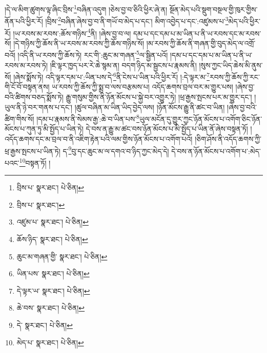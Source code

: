 །དེ་ལ་མིག་ཚུགས་ལྟ་ཞིང་བྲིས་\footnote{བྲིས་པ་  སྣར་ཐང་།  པེ་ཅིན། }བཞིན་འདུག །ཅེས་བྱ་བ་ཅིའི་ཕྱིར་ཞེ་ན། སྔོན་མེད་པའི་སྡུག་བསྔལ་གྱི་ཁུར་གྱིས་ནོན་པའི་ཕྱིར་རོ། །བྲིས་\footnote{བྲིས་པ་  སྣར་ཐང་། }བཞིན་ཞེས་བྱ་བ་ནི་གཡོ་བ་མེད་པ་དང་། མིག་འབྱེད་པ་དང་:འཛུམས་པ་\footnote{འཛུམ་པ་  སྣར་ཐང་།  པེ་ཅིན། }མེད་པའི་ཕྱིར་རོ། །ཡ་རབས་མ་རབས་:ཆོས་གཉིས་\footnote{ཆོས་ཉིད་  སྣར་ཐང་།  པེ་ཅིན། }ནི། །ཞེས་བྱ་བ་ལ། དམ་པ་དང་དམ་པ་མ་ཡིན་པ་ནི་ཡ་རབས་དང་མ་རབས་སོ། །དེ་གཉིས་ཀྱི་ཆོས་ནི་ཡ་རབས་མ་རབས་ཀྱི་ཆོས་གཉིས་སོ། །མ་རབས་ཀྱི་ཆོས་ནི་གཞན་གྱི་བུད་མེད་ལ་འགྲོ་བའོ། །འདི་ནི་ཡ་རབས་ཀྱི་ཆོས་ཏེ། རང་གི་:ཆུང་མ་གཞན་\footnote{ཆུང་མ་གཞན་གྱི་  སྣར་ཐང་།  པེ་ཅིན། }ལ་སྦྱིན་པའོ། །དམ་པ་དང་དམ་པ་མ་ཡིན་པ་ནི་ཡ་རབས་མ་རབས་ཏེ། །ཇི་ལྟར་ཁྱད་པར་རེ་ཆེ་སྙམ་ན། བདག་ཉིད་མ་སྦྱངས་པ་རྣམས་ནི། །སུས་ཀྱང་ཡིད་ཆེས་མི་ནུས་སོ། །ཞེས་སྨོས་ཏེ། འདི་ལྟར་དམ་པ་:ཡིན་པས་དེ་\footnote{ཡིན་པས་  སྣར་ཐང་།  པེ་ཅིན། }ནི་ངེས་པ་ཡིན་པའི་ཕྱིར་རོ། །:དེ་ལྟར་མ་\footnote{དེ་ལྟར་ཡ་  སྣར་ཐང་།  པེ་ཅིན། }རབས་ཀྱི་ཆོས་ཀྱི་རང་གི་ངོ་བོ་བསྟན་ནས། ཡ་རབས་ཀྱི་ཆོས་ཀྱི་སྨྲ་བ་ལས་བརྩམས་པ། འདོད་ཆགས་བྲལ་བར་མ་གྱུར་པས། །ཞེས་བྱ་བའི་ཚིགས་བཅད་སྨོས་ཏེ། རྒྱུ་གསུམ་གྱིས་ནི་ཉོན་མོངས་པ་སྐྱེ་བར་འགྱུར་ཏེ། །ཕྲ་རྒྱས་སྤངས་པར་མ་གྱུར་དང་། །ཡུལ་ནི་ཉེ་བར་གནས་པ་དང་། །ཚུལ་བཞིན་མ་ཡིན་ཡིད་བྱེད་ལས། །ཉོན་མོངས་རྒྱུ་ནི་ཚང་བ་ཡིན། །ཞེས་བྱ་བའི་ཚིག་གིས་སོ། །དམ་པ་རྣམས་ནི་སེམས་རྒྱ་:ཆེ་བ་ཡིན་པས་\footnote{ཆེ་བས་  སྣར་ཐང་།  པེ་ཅིན། }ཡུལ་མངོན་དུ་གྱུར་ཀྱང་ཉོན་མོངས་པ་འགོག་ཅིང་ཉོན་མོངས་པ་ཀུན་ཏུ་མི་སྤྱོད་པ་ཡིན་ཏེ། དེ་བས་ན་རྒྱུ་མ་ཚང་བས་ཉོན་མོངས་པ་མི་སྤྱོད་པ་ཡིན་ནོ་ཞེས་བསྟན་ཏོ། །འདོད་ཆགས་དང་མ་བྲལ་བ་ནི་འཇིག་རྟེན་པའི་ལམ་གྱིས་ཉོན་མོངས་པ་འགོག་པའོ། །ཅིག་ཤོས་ནི་འདོད་ཆགས་ཀྱི་ཕྲ་རྒྱས་སྤངས་པ་ཡིན་ཏེ། ད་\footnote{དེ་  སྣར་ཐང་།  པེ་ཅིན། }བུ་དང་ཆུང་མ་ལ་དགའ་བ་ཉིད་ཀྱང་མེད་དེ། དེ་བས་ན་ཉོན་མོངས་པ་འགོག་པ་:མེད་པའང་\footnote{མེད་པ་  སྣར་ཐང་།  པེ་ཅིན། }བསྟན་ཏོ། །
